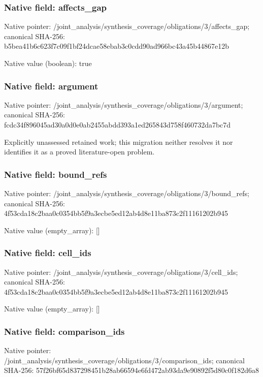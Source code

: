 \documentclass[10pt,a4paper]{article}
\begin{document}
\subsubsection{Native field: affects\_\allowbreak{}gap}
Native pointer: /joint\_\allowbreak{}analysis/synthesis\_\allowbreak{}coverage/obligations/3/affects\_\allowbreak{}gap; canonical SHA-256: b5bea41b6c623f7c09f1bf24dcae58ebab3c0cdd90ad966bc43a45b44867e12b

Native value (boolean): true

\subsubsection{Native field: argument}
Native pointer: /joint\_\allowbreak{}analysis/synthesis\_\allowbreak{}coverage/obligations/3/argument; canonical SHA-256: fcdc34f896045ad30a0d0e0ab2455abdd393a1ed265843d758f460732da7bc7d

\begingroup\raggedright\sloppy Explicitly unassessed retained work;\allowbreak{} this migration neither resolves it nor identifies it as a proved literature-open problem.\par\endgroup

\subsubsection{Native field: bound\_\allowbreak{}refs}
Native pointer: /joint\_\allowbreak{}analysis/synthesis\_\allowbreak{}coverage/obligations/3/bound\_\allowbreak{}refs; canonical SHA-256: 4f53cda18c2baa0c0354bb5f9a3ecbe5ed12ab4d8e11ba873c2f11161202b945

Native value (empty\_\allowbreak{}array): []

\subsubsection{Native field: cell\_\allowbreak{}ids}
Native pointer: /joint\_\allowbreak{}analysis/synthesis\_\allowbreak{}coverage/obligations/3/cell\_\allowbreak{}ids; canonical SHA-256: 4f53cda18c2baa0c0354bb5f9a3ecbe5ed12ab4d8e11ba873c2f11161202b945

Native value (empty\_\allowbreak{}array): []

\subsubsection{Native field: comparison\_\allowbreak{}ids}
Native pointer: /joint\_\allowbreak{}analysis/synthesis\_\allowbreak{}coverage/obligations/3/comparison\_\allowbreak{}ids; canonical SHA-256: 57f26bf65d837298451b28ab66594e6fd472ab93da9e90892f5d80c0f182d6a8
\end{document}
